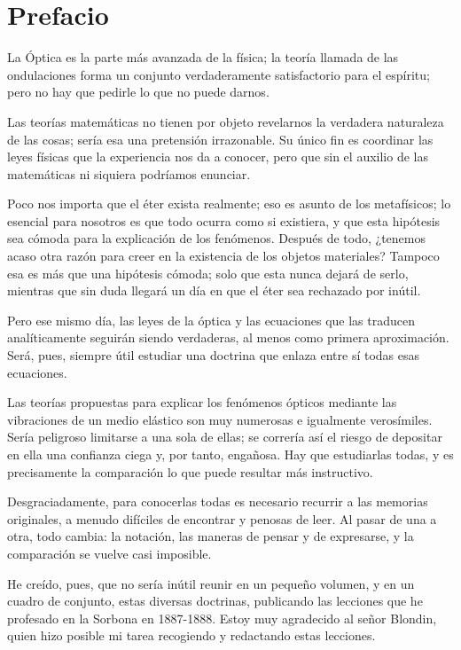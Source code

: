 \chapter*{Prefacio}

La Óptica es la parte más avanzada de la física; la teoría llamada de las
ondulaciones forma un conjunto verdaderamente satisfactorio para el
espíritu; pero no hay que pedirle lo que no puede darnos.

Las teorías matemáticas no tienen por objeto revelarnos la verdadera
naturaleza de las cosas; sería esa una pretensión irrazonable. Su único
fin es coordinar las leyes físicas que la experiencia nos da a conocer,
pero que sin el auxilio de las matemáticas ni siquiera podríamos enunciar.

Poco nos importa que el éter exista realmente; eso es asunto de los
metafísicos; lo esencial para nosotros es que todo ocurra como si
existiera, y que esta hipótesis sea cómoda para la explicación de los
fenómenos. Después de todo, ¿tenemos acaso otra razón para creer en la
existencia de los objetos materiales? Tampoco esa es más que una hipótesis
cómoda; solo que esta nunca dejará de serlo, mientras que sin duda llegará
un día en que el éter sea rechazado por inútil.

Pero ese mismo día, las leyes de la óptica y las ecuaciones que las
traducen analíticamente seguirán siendo verdaderas, al menos como primera
aproximación. Será, pues, siempre útil estudiar una doctrina que enlaza
entre sí todas esas ecuaciones.

Las teorías propuestas para explicar los fenómenos ópticos mediante las
vibraciones de un medio elástico son muy numerosas e igualmente
verosímiles. Sería peligroso limitarse a una sola de ellas; se correría
así el riesgo de depositar en ella una confianza ciega y, por tanto,
engañosa. Hay que estudiarlas todas, y es precisamente la comparación lo
que puede resultar más instructivo.

Desgraciadamente, para conocerlas todas es necesario recurrir a las
memorias originales, a menudo difíciles de encontrar y penosas de leer. Al
pasar de una a otra, todo cambia: la notación, las maneras de pensar y de
expresarse, y la comparación se vuelve casi imposible.

He creído, pues, que no sería inútil reunir en un pequeño volumen, y en un
cuadro de conjunto, estas diversas doctrinas, publicando las lecciones que
he profesado en la Sorbona en 1887-1888. Estoy muy agradecido al señor
Blondin, quien hizo posible mi tarea recogiendo y redactando estas
lecciones.

